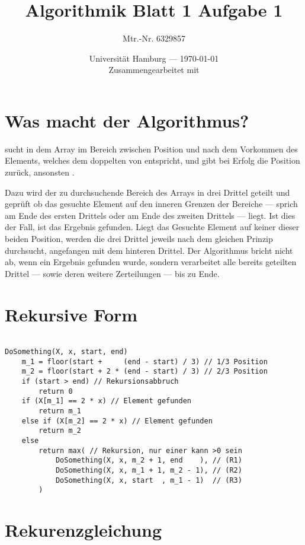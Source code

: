 \documentclass[parskip=half,a4paper]{scrartcl}
\title{Algorithmik Blatt 1 Aufgabe 1} %
\author{Mtr.-Nr. 6329857} %
\date{Universität Hamburg --- \today \\ Zusammengearbeitet mit} %
\begin{document}
\maketitle %

\section*{Was macht der Algorithmus?}

 sucht in dem Array  im Bereich zwischen Position
 und  nach dem Vorkommen des Elements, welches dem doppelten von 
entspricht, und gibt bei Erfolg die Position zurück, ansonsten .

Dazu wird der zu durchsuchende Bereich des Arrays in drei Drittel geteilt und geprüft ob das gesuchte Element auf den inneren Grenzen der Bereiche --- sprich am Ende des ersten Drittels oder am Ende des zweiten Drittels --- liegt. Ist dies der Fall, ist das Ergebnis gefunden. Liegt das Gesuchte Element auf keiner dieser beiden Position, werden die drei Drittel jeweils nach dem gleichen Prinzip durchsucht, angefangen mit dem hinteren Drittel. Der Algorithmus bricht nicht ab, wenn ein Ergebnis gefunden wurde, sondern verarbeitet alle bereits geteilten Drittel --- sowie deren weitere Zerteilungen --- bis zu Ende.

\section*{Rekursive Form}

\begin{verbatim}

DoSomething(X, x, start, end)
    m_1 = floor(start +     (end - start) / 3) // 1/3 Position
    m_2 = floor(start + 2 * (end - start) / 3) // 2/3 Position
    if (start > end) // Rekursionsabbruch
        return 0
    if (X[m_1] == 2 * x) // Element gefunden
        return m_1
    else if (X[m_2] == 2 * x) // Element gefunden
        return m_2
    else
        return max( // Rekursion, nur einer kann >0 sein
            DoSomething(X, x, m_2 + 1, end    ), // (R1)
            DoSomething(X, x, m_1 + 1, m_2 - 1), // (R2)
            DoSomething(X, x, start  , m_1 - 1)  // (R3)
        )

\end{verbatim}

\section*{Rekurenzgleichung}
\end{document}
